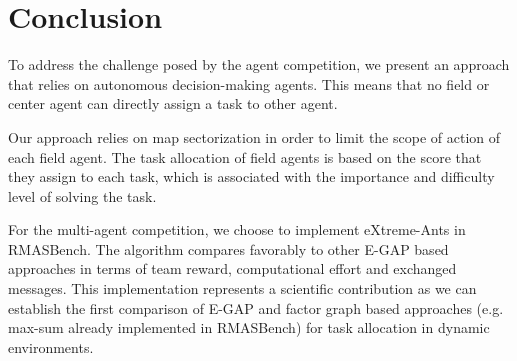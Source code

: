 \section{Conclusion}

To address the challenge posed by the agent competition, we present an approach that relies on autonomous decision-making agents. This means that no field or center agent can directly assign a task to other agent. %

Our approach relies on map sectorization in order to limit the scope of action of each field agent. The task allocation of field agents is based on the score that they assign to each task, which is associated with the importance and difficulty level of solving the task. %

For the multi-agent competition, we choose to implement eXtreme-Ants in RMASBench. The algorithm compares favorably to other E-GAP based approaches in terms of team reward, computational effort and exchanged messages. This implementation represents a scientific contribution as we can establish the first comparison of E-GAP and factor graph based approaches (e.g. max-sum already implemented in RMASBench) for task allocation in dynamic environments.%

